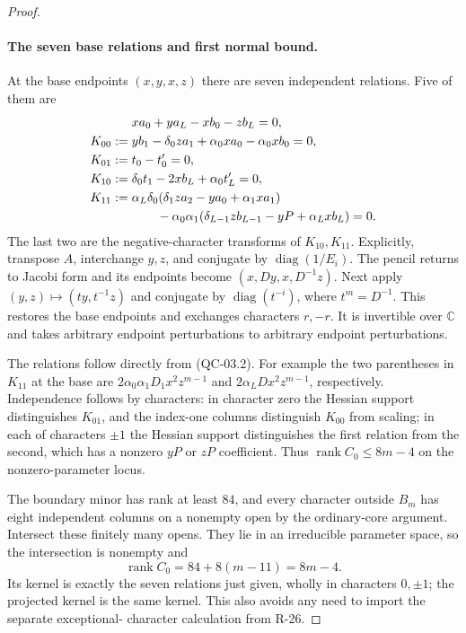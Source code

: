 \begin{proof}
\paragraph{The seven base relations and first normal bound.}
At the base endpoints $(x,y,x,z)$ there are seven independent
relations. Five of them are
\begin{align*}
&xa_0+ya_L-xb_0-zb_L=0,\\
K_{00}:={}&yb_1-\delta_0za_1+\alpha_0xa_0-\alpha_0xb_0=0,\\
K_{01}:={}&t_0-t'_0=0,\\
K_{10}:={}&\delta_0t_1-2xb_L+\alpha_0t'_L=0,\\
K_{11}:={}&\alpha_L\delta_0
       (\delta_1za_2-ya_0+\alpha_1xa_1)\\
&\hspace{7mm}-\alpha_0\alpha_1
       (\delta_{L-1}zb_{L-1}-yP+\alpha_Lxb_L)=0.
\end{align*}
The last two are the negative-character transforms of $K_{10},K_{11}$.
Explicitly, transpose $A$, interchange $y,z$, and conjugate by
$\operatorname{diag}(1/E_i)$. The pencil returns to Jacobi form
and its endpoints become $(x,Dy,x,D^{-1}z)$.
Next apply $(y,z)\mapsto(ty,t^{-1}z)$ and conjugate by
$\operatorname{diag}(t^{-i})$, where $t^m=D^{-1}$.
This restores the base endpoints and exchanges characters $r,-r$.
It is invertible over $\mathbb C$ and takes arbitrary endpoint
perturbations to arbitrary endpoint perturbations.

The relations follow directly from (QC-03.2). For example the two
parentheses in $K_{11}$ at the base are
$2\alpha_0\alpha_1D_1x^2z^{m-1}$ and
$2\alpha_LDx^2z^{m-1}$, respectively. Independence follows by
characters: in character zero the Hessian support distinguishes
$K_{01}$, and the index-one columns distinguish $K_{00}$ from
scaling; in each of characters $\pm1$ the Hessian support
distinguishes the first relation from the second, which has a
nonzero $yP$ or $zP$ coefficient. Thus $\operatorname{rank}C_0
\leq8m-4$ on the nonzero-parameter locus.

The boundary minor has rank at least $84$, and every character
outside $B_m$ has eight independent columns on a nonempty open
by the ordinary-core argument. Intersect these finitely many opens.
They lie in an irreducible parameter space, so the intersection
is nonempty and
\[
 \operatorname{rank}C_0=84+8(m-11)=8m-4.
 \tag{QC-03.8}
\]
Its kernel is exactly the seven relations just given, wholly in
characters $0,\pm1$; the projected kernel is the same kernel.
This also avoids any need to import the separate exceptional-
character calculation from R-26.


\end{proof}
